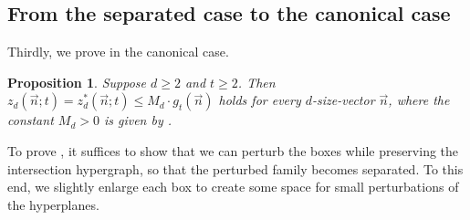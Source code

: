\documentclass[11pt]{article}
\newtheorem{proposition}[theorem]{Proposition}
\theoremstyle{definition}
\newcommand*{\vn}{\vec{n}}
\begin{document}
\subsection{From the separated case to the canonical case} \label{sec:upper_canonical}

Thirdly, we prove  in the canonical case. 

\begin{proposition} \label{prop:upper_canonical}
    Suppose $d \ge 2$ and $t \ge 2$. Then $z_d(\vn; t) = z_d^*(\vn; t) \le M_d \cdot g_t(\vn)$ holds for every $d$-size-vector $\vn$, where the constant $M_d > 0$ is given by .
    \vspace{-0.5em}
\end{proposition}

To prove , it suffices to show that we can perturb the boxes while preserving the intersection hypergraph, so that the perturbed family becomes separated. To this end, we slightly enlarge each box to create some space for small perturbations of the hyperplanes. 
\end{document}
